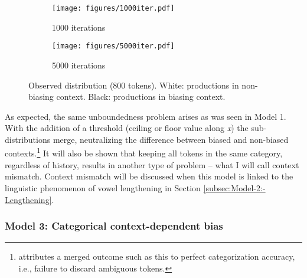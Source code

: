 \begin{figure}[H]

\begin{subfigure}[t]{.45\textwidth}
        \texttt{[image: figures/1000iter.pdf]}
        \caption{1000 iterations}
    \end{subfigure}\hfill
    \begin{subfigure}[t]{.45\textwidth}
        \texttt{[image: figures/5000iter.pdf]}
        \caption{5000 iterations}
    \end{subfigure}
    

\caption{\label{fig:End context mismatch}Observed distribution (800 tokens).
White: productions in non-biasing context. Black: productions in biasing
context.}
\end{figure}

As expected, the same unboundedness problem arises as was seen in
Model 1. With the addition of a threshold (ceiling or floor value
along \emph{x}) the sub-distributions merge, neutralizing the difference
between biased and non-biased contexts.\footnote{\citet{DBLP:journals/corr/Tupper14a} attributes a merged outcome
such as this to perfect categorization accuracy, i.e., failure to
discard ambiguous tokens. } It will also be shown that keeping all tokens in the same category,
regardless of history, results in another type of problem – what I
will call context mismatch. Context mismatch will be discussed when
this model is linked to the linguistic phenomenon of vowel lengthening
in Section \ref{subsec:Model-2:-Lengthening}.

\subsubsection{\label{subsec:Model-3:-Categorical}Model 3: Categorical context-dependent bias}

